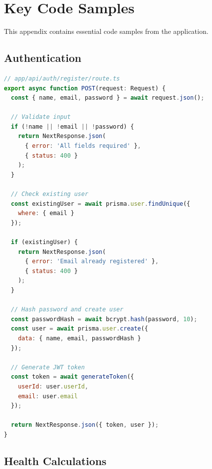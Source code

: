 \chapter{Key Code Samples}

This appendix contains essential code samples from the application.

\section{Authentication}

\begin{lstlisting}[language=JavaScript, caption=User Registration API]
// app/api/auth/register/route.ts
export async function POST(request: Request) {
  const { name, email, password } = await request.json();
  
  // Validate input
  if (!name || !email || !password) {
    return NextResponse.json(
      { error: 'All fields required' }, 
      { status: 400 }
    );
  }
  
  // Check existing user
  const existingUser = await prisma.user.findUnique({
    where: { email }
  });
  
  if (existingUser) {
    return NextResponse.json(
      { error: 'Email already registered' }, 
      { status: 400 }
    );
  }
  
  // Hash password and create user
  const passwordHash = await bcrypt.hash(password, 10);
  const user = await prisma.user.create({
    data: { name, email, passwordHash }
  });
  
  // Generate JWT token
  const token = await generateToken({
    userId: user.userId,
    email: user.email
  });
  
  return NextResponse.json({ token, user });
}
\end{lstlisting}

\section{Health Calculations}

